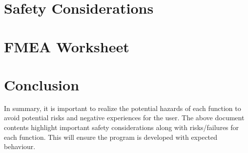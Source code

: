\documentclass{article}
\begin{document}
\section{Safety Considerations}

\section{FMEA Worksheet}

\section{Conclusion}
In summary, it is important to realize the potential hazards of each function to avoid potential risks and negative experiences for the user. The above document contents highlight
important safety considerations along with risks/failures for each function. This will ensure
the program is developed with expected behaviour.
\end{document}
